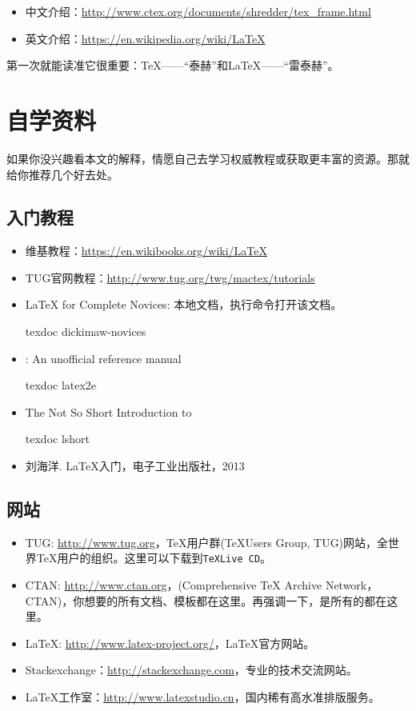 \documentclass{hitec}
\begin{document}
\begin{itemize}
\item 中文介绍：\url{http://www.ctex.org/documents/shredder/tex_frame.html}
\item 英文介绍：\url{https://en.wikipedia.org/wiki/LaTeX}
\end{itemize}

第一次就能读准它很重要：\TeX{}——“泰赫”和\LaTeX{}——“雷泰赫”。

\section{自学资料}
如果你没兴趣看本文的解释，情愿自己去学习权威教程或获取更丰富的资源。那就给你推荐几个好去处。

\subsection{入门教程}
\begin{itemize}
\item 维基教程：\url{https://en.wikibooks.org/wiki/LaTeX}
\item TUG官网教程：\url{http://www.tug.org/twg/mactex/tutorials}
\item \LaTeX{} for Complete Novices: 本地文档，执行命令打开该文档。 
  \begin{cmd}
texdoc dickimaw-novices
  \end{cmd}
 \item \LaTeXe{}: An unofficial reference manual
  \begin{cmd}
texdoc latex2e
 \end{cmd}
 \item The Not So Short Introduction to \LaTeXe{}
   \begin{cmd}  
texdoc lshort
   \end{cmd}
\item 刘海洋. \LaTeX{}入门，电子工业出版社，2013
\end{itemize}

\subsection{网站}

\begin{itemize}
\item TUG: \url{http://www.tug.org}，\TeX{}用户群(\TeX Users Group, TUG)网站，全世界\TeX{}用户的组织。这里可以下载到\texttt{TeXLive CD}。
\item CTAN: \url{http://www.ctan.org}，(Comprehensive TeX Archive Network，CTAN)，你想要的所有文档、模板都在这里。再强调一下，是所有的都在这里。
\item LaTeX: \url{http://www.latex-project.org/}，\LaTeX{}官方网站。
\item Stackexchange：\url{http://stackexchange.com}，专业的技术交流网站。 
\item \LaTeX{}工作室：\url{http://www.latexstudio.cn}，国内稀有高水准排版服务。
\end{itemize}
\end{document}
